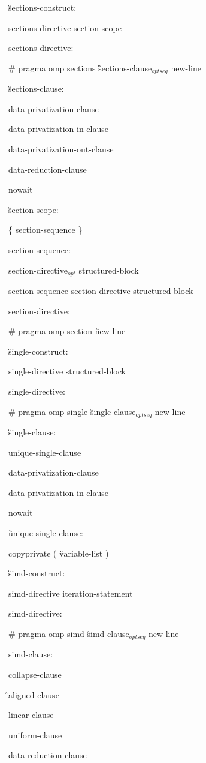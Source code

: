 {\G sections-construct:

\I sections-directive section-scope

sections-directive:

\C\I \# pragma omp sections \G sections-clause$_{optseq}$ new-line

\G sections-clause:

\I data-privatization-clause 

\I data-privatization-in-clause 

\I data-privatization-out-clause 

\I data-reduction-clause 

\C\I nowait

\G section-scope:

\I \{ section-sequence \}

section-sequence:

\I section-directive$_{opt}$ structured-block

\I section-sequence section-directive structured-block

section-directive:

\C\I \# pragma omp section \G new-line

\G single-construct:

\I single-directive structured-block

single-directive:

\C\I \# pragma omp single \G single-clause$_{optseq}$ new-line

\G single-clause:

\I unique-single-clause

\I data-privatization-clause

\I data-privatization-in-clause

\C\I nowait

\G unique-single-clause:

\C\I copyprivate ( \G variable-list \C )

\G simd-construct:

\I simd-directive iteration-statement

simd-directive:

\C\I \# pragma omp simd \G simd-clause$_{optseq}$ new-line

simd-clause:

\I collapse-clause

\G\I aligned-clause

\I linear-clause

\I uniform-clause

\I data-reduction-clause

}
